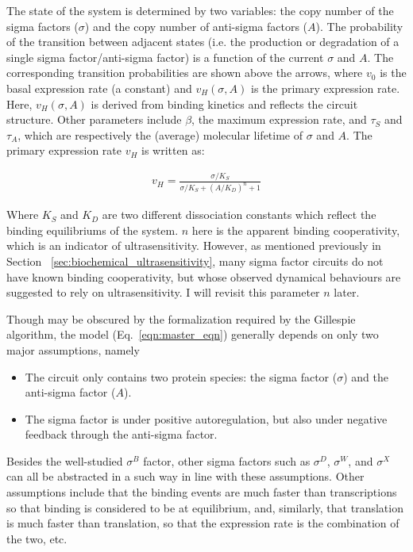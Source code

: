 The state of the system is determined by two variables:
the copy number of the sigma factors ($\sigma$) and the copy number
of anti-sigma factors ($A$).
The probability of the transition between adjacent states
(i.e. the production or degradation of a single sigma factor/anti-sigma
factor) is a function of the current $\sigma$ and $A$.
The corresponding transition probabilities are shown above the
arrows, where $v_0$ is the basal expression rate (a constant)
and $v_H(\sigma, A)$ is the primary expression rate.
Here, $v_H(\sigma, A)$ is derived from binding kinetics and
reflects the circuit structure.
Other parameters include $\beta$, the maximum expression rate,
and $\tau_S$ and $\tau_A$, which are respectively the (average)
molecular lifetime of $\sigma$ and $A$.
The primary expression rate $v_H$ is written as:

\begin{align}
    v_H = \frac{\sigma/K_S}{\sigma/K_S + (A/K_D)^n + 1}
\end{align}

Where $K_S$ and $K_D$ are two different dissociation constants which
reflect the binding equilibriums of the system.
$n$ here is the apparent binding cooperativity, which is an indicator
of ultrasensitivity.
However, as mentioned previously in Section~
\ref{sec:biochemical_ultrasensitivity}, many sigma factor circuits
do not have known binding cooperativity, but whose observed
dynamical behaviours are suggested to rely on ultrasensitivity.
I will revisit this parameter $n$ later.

Though may be obscured by the formalization required by the 
Gillespie algorithm, the model (Eq.~\ref{eqn:master_eqn}) generally
depends on only two major assumptions, namely

\begin{itemize}
    \item The circuit only contains two protein species: the sigma
    factor ($\sigma$) and the anti-sigma factor ($A$).
    \item The sigma factor is under positive autoregulation, but
    also under negative feedback through the anti-sigma factor.
\end{itemize}

Besides the well-studied $\sigma^B$ factor, other sigma factors
such as $\sigma^D$, $\sigma^W$, and $\sigma^X$ 
\cite{haldenwang95, huang98, hsueh11} can all be 
abstracted in a such way in line with these assumptions.
Other assumptions include that the binding events are much
faster than transcriptions so that binding is considered to be
at equilibrium, and, similarly, that translation is much 
faster than translation, so that the expression rate is the
combination of the two, etc.



